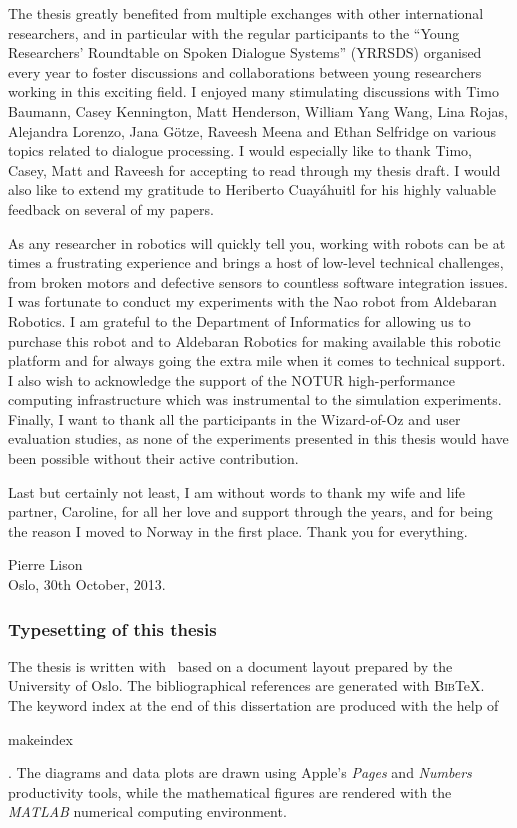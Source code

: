 The thesis greatly benefited from multiple exchanges with other international researchers, and in particular with the regular participants to the ``Young Researchers' Roundtable on Spoken Dialogue Systems'' (YRRSDS) organised every year to foster discussions and collaborations between young researchers working in this exciting field. I enjoyed many stimulating discussions with Timo Baumann, Casey Kennington, Matt Henderson, William Yang Wang, Lina Rojas, Alejandra Lorenzo, Jana G\"otze, Raveesh Meena and Ethan Selfridge on various topics related to dialogue processing.  I would especially like to thank Timo, Casey, Matt and Raveesh for accepting to read through my thesis draft. I would also like to extend my gratitude to Heriberto Cuay\'{a}huitl for his highly valuable feedback on several of my papers.

As any researcher in robotics will quickly tell you, working with robots can be at times a frustrating experience and brings a host of low-level technical challenges, from broken motors and defective sensors to countless software integration issues. I was fortunate to conduct my experiments with the Nao robot from Aldebaran Robotics.  I am grateful to the Department of Informatics for allowing us to purchase this robot and to Aldebaran Robotics for making available this robotic platform and for always going the extra mile when it comes to technical support. I also wish to acknowledge the support of the NOTUR high-performance computing infrastructure which was instrumental to the simulation experiments. Finally, I want to thank all the participants in the Wizard-of-Oz and user evaluation studies, as none of the experiments presented in this thesis would have been possible without their active contribution.

Last but certainly not least, I am without words to thank my wife and life partner, Caroline, for all her love and support through the years, and for being the reason I moved to Norway in the first place. Thank you for everything.

\vspace{1cm}

\begin{flushright}Pierre Lison \\ Oslo, 30th October, 2013. \end{flushright}

\null 
\vfill
\begin{footnotesize}\subsubsection*{Typesetting of this thesis}
The thesis is written with \LaTeXe \ based on a document layout prepared by the University of Oslo. The bibliographical references are generated with \textsc{Bib}\negthinspace\TeX.  The keyword index at the end of this dissertation are produced with the help of \begin{scriptsize}\textsf{makeindex}\end{scriptsize}. The diagrams and data plots are drawn using Apple's \textit{Pages} and \textit{Numbers} productivity tools, while the mathematical figures are rendered with the \textit{MATLAB} numerical computing environment.\end{footnotesize}
